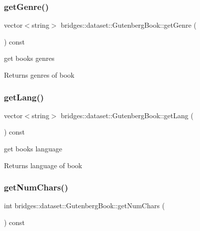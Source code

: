 \subsubsection{\texorpdfstring{get\+Genre()}{getGenre()}}
{\footnotesize\ttfamily vector$<$string$>$ bridges\+::dataset\+::\+Gutenberg\+Book\+::get\+Genre (\begin{DoxyParamCaption}{ }\end{DoxyParamCaption}) const\hspace{0.3cm}{\ttfamily [inline]}}

get book\textquotesingle{}s genres \begin{DoxyReturn}{Returns}
genres of book 
\end{DoxyReturn}
\mbox{\label{classbridges_1_1dataset_1_1_gutenberg_book_a6e131887b78b9741f410cd022e11af19}} 
\subsubsection{\texorpdfstring{get\+Lang()}{getLang()}}
{\footnotesize\ttfamily vector$<$string$>$ bridges\+::dataset\+::\+Gutenberg\+Book\+::get\+Lang (\begin{DoxyParamCaption}{ }\end{DoxyParamCaption}) const\hspace{0.3cm}{\ttfamily [inline]}}

get book\textquotesingle{}s language \begin{DoxyReturn}{Returns}
language of book 
\end{DoxyReturn}
\mbox{\label{classbridges_1_1dataset_1_1_gutenberg_book_a79b1515db41bce12b1819af5d1c90006}} 
\subsubsection{\texorpdfstring{get\+Num\+Chars()}{getNumChars()}}
{\footnotesize\ttfamily int bridges\+::dataset\+::\+Gutenberg\+Book\+::get\+Num\+Chars (\begin{DoxyParamCaption}{ }\end{DoxyParamCaption}) const\hspace{0.3cm}{\ttfamily [inline]}}

